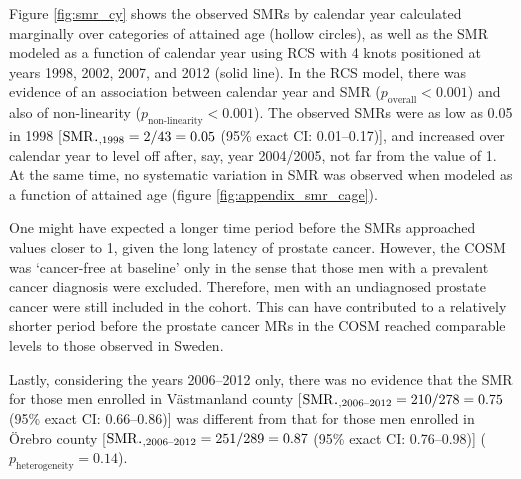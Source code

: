 Figure \ref{fig:smr_cy} shows the observed SMRs by calendar year calculated marginally over categories of attained age (hollow circles), as well as the SMR modeled as a function of calendar year using RCS with 4 knots positioned at years 1998, 2002, 2007, and 2012 (solid line). In the RCS model, there was evidence of an association between calendar year and SMR ($p_{\textrm{overall}}<0.001$) and also of non-linearity ($p_{\textrm{non-linearity}}<0.001$). The observed SMRs were as low as 0.05 in 1998 [$\SMR_{\LargerCdot, 1998}=2/43=0.05$ (95\% exact CI: 0.01--0.17)], and increased over calendar year to level off after, say, year 2004/2005, not far from the value of 1. %
At the same time, no systematic variation in SMR was observed when modeled as a function of attained age (figure \ref{fig:appendix_smr_cage}).

One might have expected a longer time period before the SMRs approached values closer to 1, given the long latency of prostate cancer. However, the COSM was `cancer-free at baseline' only in the sense that those men with a prevalent cancer diagnosis were excluded. Therefore, men with an undiagnosed prostate cancer were still included in the cohort. This can have contributed to a relatively shorter period before the prostate cancer MRs in the COSM reached comparable levels to those observed in Sweden.

Lastly, considering the years 2006--2012 only, there was no evidence that the SMR for those men enrolled in Västmanland county [$\SMR_{\LargerCdot, \textrm{2006--2012}}=210/278 = 0.75$ (95\% exact CI: 0.66--0.86)] was different from that for those men enrolled in Örebro county [$\SMR_{\LargerCdot, \textrm{2006--2012}}=251/289 = 0.87$ (95\% exact CI: 0.76--0.98)] ($p_{\mathrm{heterogeneity}} = 0.14$).


